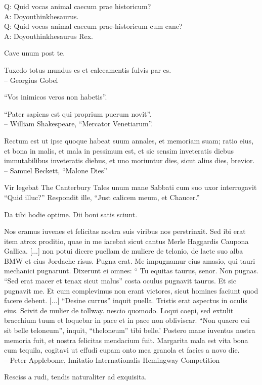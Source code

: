 \documentclass[titlepage,12pt]{memoir}
\begin{document}
Q: Quid vocas animal caecum prae historicum?\\
A: Doyouthinkhesaurus.\\
Q: Quid vocas animal caecum prae-historicum cum cane?\\
A: Doyouthinkhesaurus Rex.

Cave unum post te.

Tuxedo totus mundus es et calceamentis fulvis par es.
\\-- Georgius Gobel

“Vos inimicos veros non habetis”.

“Pater sapiens est qui proprium puerum novit”.
\\-- William Shakespeare, “Mercator Venetiarum”.

Rectum est ut ipse quoque habeat suum annales, et memoriam suam;
ratio eius, et bona in malis, et mala in
pessimum est, et sic sensim inveteratis diebus immutabilibus inveteratis diebus, et uno moriuntur
dies, sicut alius dies, brevior.
\\-- Samuel Beckett, “Malone Dies”

 Vir legebat The Canterbury Tales unum mane Sabbati cum suo
uxor interrogavit “Quid illuc?” Respondit ille, “Just calicem meum, et Chaucer.”

Da tibi hodie optime. Dii boni satis sciunt.

Nos eramus iuvenes et felicitas nostra suis viribus nos perstrinxit. Sed ibi erat
item atrox proditio, quae in me iacebat sicut cantus Merle Haggardis
Caupona Gallica. [...]
non potui dicere puellam de muliere de telonio, de lacte suo
alba BMW et eius Jordache risus. Pugna erat. Me impugnamur eius
amasio, qui tauri mechanici pugnarunt. Dixerunt ei omnes: “ Tu equitas
taurus, senor. Non pugnas. “Sed erat macer et tenax sicut malus”
costa oculus pugnavit taurus. Et sic pugnavit me. Et cum complevimus
non erant victores, sicut homines faciunt quod facere debent. [...]
“Desine currus” inquit puella.
Tristis erat aspectus in oculis eius. Scivit de
mulier de tollway. nescio quomodo. Loqui coepi, sed extulit
bracchium tuum et loquebar in pace et in pace non obliviscar.
“Non quaero cui sit belle teloneum”, inquit, “theloneum”
tibi belle.’
Postero mane iuventus nostra memoria fuit, et nostra felicitas mendacium fuit.
Margarita mala est vita bona cum tequila, cogitavi ut effudi cupam
onto mea granola et facies a novo die.
\\-- Peter Applebome, Imitatio Internationalis Hemingway
Competition

Resciss a rudi, tendis naturaliter ad exquisita.
\end{document}

